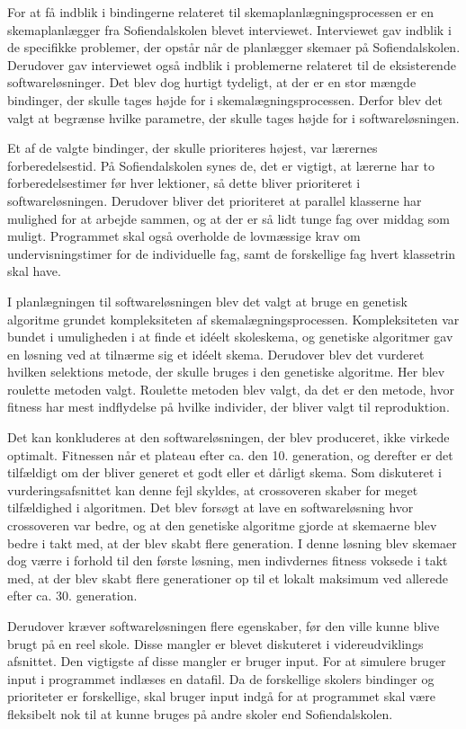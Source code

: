 For at få indblik i bindingerne relateret til skemaplanlægningsprocessen er en skemaplanlægger fra Sofiendalskolen blevet interviewet. Interviewet gav indblik i de specifikke problemer, der opstår når de planlægger skemaer på Sofiendalskolen. Derudover gav interviewet også indblik i problemerne relateret til de eksisterende softwareløsninger. Det blev dog hurtigt tydeligt, at der er en stor mængde bindinger, der skulle tages højde for i skemalægningsprocessen. Derfor blev det valgt at begrænse hvilke parametre, der skulle tages højde for i softwareløsningen. 

Et af de valgte bindinger, der skulle prioriteres højest, var lærernes forberedelsestid. På Sofiendalskolen synes de, det er vigtigt, at lærerne har to forberedelsestimer før hver lektioner, så dette bliver prioriteret i softwareløsningen. Derudover bliver det prioriteret at parallel klasserne har mulighed for at arbejde sammen, og at der er så lidt tunge fag over middag som muligt. Programmet skal også overholde de lovmæssige krav om undervisningstimer for de individuelle fag, samt de forskellige fag hvert klassetrin skal have. 

I planlægningen til softwareløsningen blev det valgt at bruge en genetisk algoritme grundet kompleksiteten af skemalægningsprocessen. Kompleksiteten var bundet i umuligheden i at finde et idéelt skoleskema, og genetiske algoritmer gav en løsning ved at tilnærme sig et idéelt skema. Derudover blev det vurderet hvilken selektions metode, der skulle bruges i den genetiske algoritme. Her blev roulette metoden valgt. Roulette metoden blev valgt, da det er den metode, hvor fitness har mest indflydelse på hvilke individer, der bliver valgt til reproduktion. 

Det kan konkluderes at den softwareløsningen, der blev produceret, ikke virkede optimalt. Fitnessen når et plateau efter ca. den 10. generation, og derefter er det tilfældigt om der bliver generet et godt eller et dårligt skema. Som diskuteret i vurderingsafsnittet kan denne fejl skyldes, at crossoveren skaber for meget tilfældighed i algoritmen. Det blev forsøgt at lave en softwareløsning hvor crossoveren var bedre, og at den genetiske algoritme gjorde at skemaerne blev bedre i takt med, at der blev skabt flere generation. I denne løsning blev skemaer dog værre i forhold til den første løsning, men indivdernes fitness voksede i takt med, at der blev skabt flere generationer op til et lokalt maksimum ved allerede efter ca. 30. generation.

Derudover kræver softwareløsningen flere egenskaber, før den ville kunne blive brugt på en reel skole. Disse mangler er blevet diskuteret i videreudviklings afsnittet. Den vigtigste af disse mangler er bruger input. For at simulere bruger input i programmet indlæses en datafil. Da de forskellige skolers bindinger og prioriteter er forskellige, skal  bruger input indgå for at programmet skal være fleksibelt nok til at kunne bruges på andre skoler end Sofiendalskolen.
